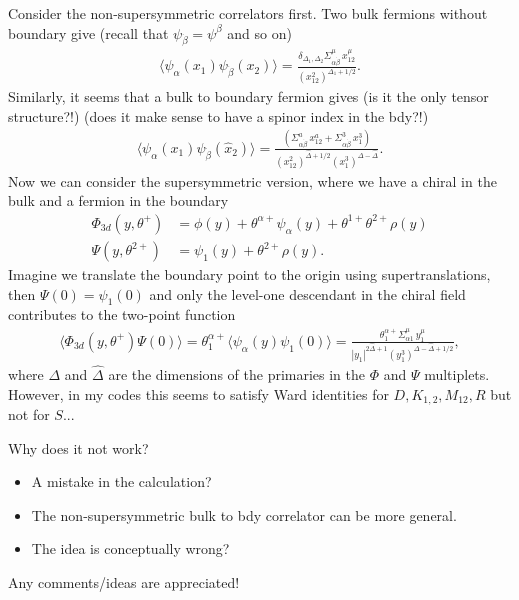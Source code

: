 \documentclass[letterpaper]{article}
\def\a{{\alpha}}
\def\b{{\beta}}
\def\bd{{\dot{\beta}}}
\begin{document}
Consider the non-supersymmetric correlators first.
Two bulk fermions without boundary give (recall that $\psi_\bd = \psi^\b$ and so on)
\begin{align}
 \langle \psi_\a(x_1) \psi_\bd(x_2) \rangle 
 = \frac{ \delta_{\Delta_1, \Delta_2} \Sigma^\mu_{\a\bd} \, x_{12}^\mu}{(x_{12}^2)^{\Delta_1+1/2}}.
\end{align}
Similarly, it seems that a bulk to boundary fermion gives (is it the only tensor structure?!) (does it make sense to have a spinor index in the bdy?!)
\begin{align}
 \langle \psi_\a(x_1) \hat \psi_\bd(\hat x_2) \rangle 
 = \frac{\left(
    \Sigma^a_{\a\bd} \, x_{12}^a + \Sigma^3_{\a\bd} \, x_{1}^3 
 \right)}{(x_{12}^2)^{\hat \Delta+1/2} (x_1^3)^{\Delta-\hat\Delta}}.
\end{align}
Now we can consider the supersymmetric version, where we have a chiral in the bulk and a fermion in the boundary
\begin{align}
  \Phi_{3d}(y, \theta^+) 
& = \phi(y) 
  + \theta^{\a+} \psi_\a(y)
  + \theta^{1+} \theta^{2+} \rho(y) \\
  \Psi(y, \theta^{2+})
& = \psi_1(y) + \theta^{2+} \rho(y).
\end{align}
Imagine we translate the boundary point to the origin using supertranslations, then $\Psi(0) = \psi_1(0)$ and only the level-one descendant in the chiral field contributes to the two-point function
\begin{align}
 \langle \Phi_{3d}(y, \theta^+) \Psi(0) \rangle
 = \theta_1^{\a+} \langle \psi_\a(y) \psi_1(0) \rangle
 = \frac{\theta_1^{\a+} \Sigma^\mu_{\a1} \, y_1^\mu}
        {|y_1|^{2 \hat \Delta+1} (y_1^3)^{\Delta-\hat\Delta+1/2}},
\end{align}
where $\Delta$ and $\hat \Delta$ are the dimensions of the primaries in the $\Phi$ and $\Psi$ multiplets.
However, in my codes this seems to satisfy Ward identities for $D, K_{1,2}, M_{12}, R$ but not for $S$...

Why does it not work?
\begin{itemize}
 \item A mistake in the calculation?
 \item The non-supersymmetric bulk to bdy correlator can be more general.
 \item The idea is conceptually wrong?
\end{itemize}
Any comments/ideas are appreciated! 



\appendix
\end{document}
